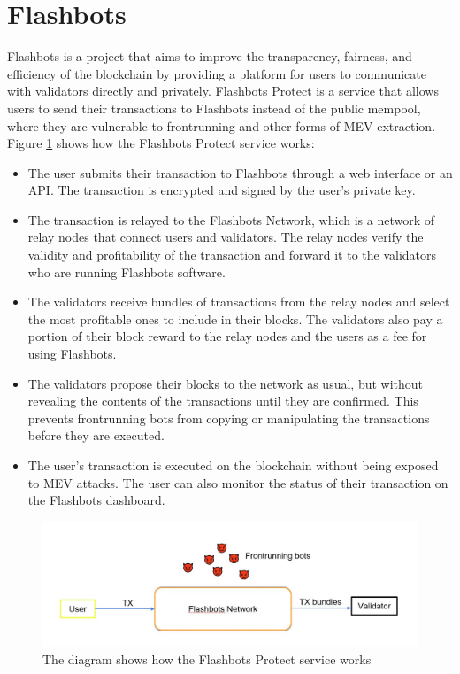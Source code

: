 \section{Flashbots}
Flashbots is a project that aims to improve the transparency, fairness, and efficiency of the blockchain by providing a platform for users to communicate with validators directly and privately. Flashbots Protect is a service that allows users to send their transactions to Flashbots instead of the public mempool, where they are vulnerable to frontrunning and other forms of MEV extraction.\\
Figure \ref{fig:L22_f1} shows how the Flashbots Protect service works:
\begin{itemize}
	\item The user submits their transaction to Flashbots through a web interface or an API. The transaction is encrypted and signed by the user’s private key.
	\item The transaction is relayed to the Flashbots Network, which is a network of relay nodes that connect users and validators. The relay nodes verify the validity and profitability of the transaction and forward it to the validators who are running Flashbots software.
	\item The validators receive bundles of transactions from the relay nodes and select the most profitable ones to include in their blocks. The validators also pay a portion of their block reward to the relay nodes and the users as a fee for using Flashbots.
	\item The validators propose their blocks to the network as usual, but without revealing the contents of the transactions until they are confirmed. This prevents frontrunning bots from copying or manipulating the transactions before they are executed.
	\item The user’s transaction is executed on the blockchain without being exposed to MEV attacks. The user can also monitor the status of their transaction on the Flashbots dashboard.
\end{itemize}
\begin{center}
	\begin{figure}
		\centering
		\includegraphics[width=0.8\linewidth]{Fig/22/F1}
		\caption{The diagram shows how the Flashbots Protect service works}
		\label{fig:L22_f1}
	\end{figure}
\end{center}
